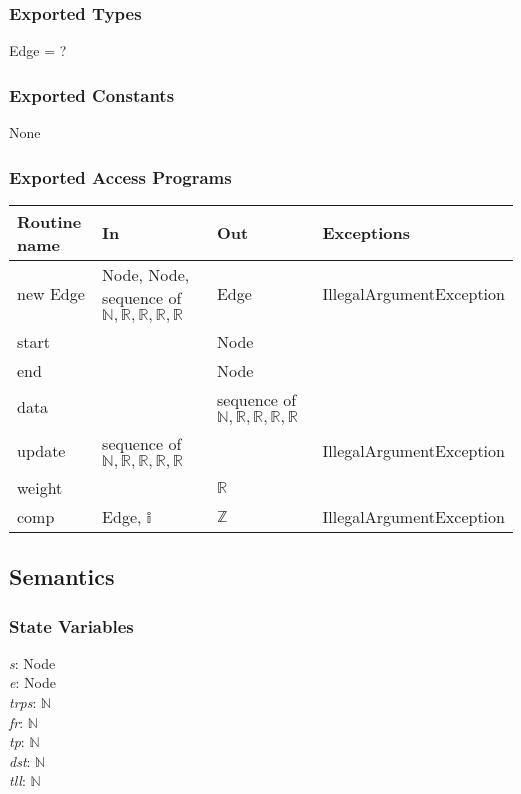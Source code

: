 \documentclass[12pt]{article}
\begin{document}
\subsubsection*{Exported Types}

Edge = ?

\subsubsection* {Exported Constants}

None

\subsubsection*{Exported Access Programs}

\begin{tabular}{| l | l | l | l |}
	\hline
	\textbf{Routine name} & \textbf{In} & \textbf{Out} & \textbf{Exceptions}\\
	\hline
	new Edge & Node, Node, sequence of $\mathbb{N}, \mathbb{R}, \mathbb{R}, \mathbb{R}, \mathbb{R}$ & Edge & IllegalArgumentException\\
	\hline
	start & ~ & Node & ~\\
	\hline
	end & ~ & Node & ~\\
	\hline
	data & ~ & sequence of $\mathbb{N}, \mathbb{R}, \mathbb{R}, \mathbb{R}, \mathbb{R}$ & ~\\
	\hline
	update & sequence of $\mathbb{N}, \mathbb{R}, \mathbb{R}, \mathbb{R}, \mathbb{R}$ & ~ & IllegalArgumentException\\
	\hline
	weight & ~ & $\mathbb{R}$ & ~\\
	\hline
	comp & Edge, $\mathbb{i}$ & $\mathbb{Z}$ & IllegalArgumentException\\
	\hline
\end{tabular}

\subsection*{Semantics}

\subsubsection*{State Variables}

\textit{s}: Node \\
\textit{e}: Node \\
\textit{trps}: $\mathbb{N}$ \\
\textit{fr}: $\mathbb{N}$ \\
\textit{tp}: $\mathbb{N}$ \\
\textit{dst}: $\mathbb{N}$ \\
\textit{tll}: $\mathbb{N}$
\end{document}
